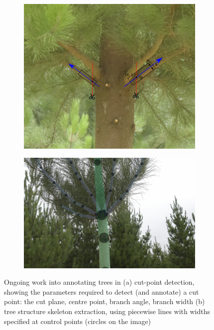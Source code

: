 \begin{figure}[h!]
\begin{subfigure}[t]{0.5\linewidth}
  \centering
  \includegraphics[height=0.25\textheight]{figures/future/tree_cutpoint.pdf}
  \caption{} 
\end{subfigure}%
\begin{subfigure}[t]{0.5\linewidth}
  \centering
  \includegraphics[height=0.25\textheight]{figures/future/tree_branches.jpg}
  \caption{} 
\end{subfigure}
\caption{Ongoing work into annotating trees in (a) cut-point detection, showing the parameters required to detect (and annotate) a cut point: the cut plane, centre point, branch angle, branch width (b) tree structure skeleton extraction, using piecewise lines with widths specified at control points (circles on the image) }
\label {fig:future_trees}
\end{figure}

